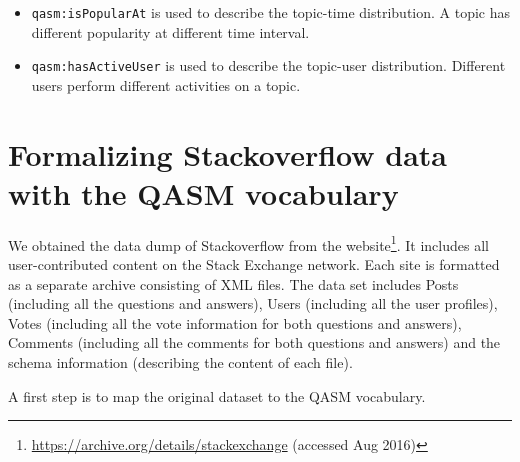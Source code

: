 \begin{itemize}
\item \texttt{qasm:isPopularAt} is used to describe the topic-time distribution. A topic has different popularity at different time interval.

\item \texttt{qasm:hasActiveUser} is used to describe the topic-user distribution. Different users perform different activities on a topic.
\end{itemize}





\section{Formalizing Stackoverflow data with the QASM vocabulary}

We obtained the data dump of Stackoverflow from the website\footnote{\url{https://archive.org/details/stackexchange} (accessed Aug 2016)}. It includes all user-contributed content on the Stack Exchange network. Each site is formatted as a separate archive consisting of XML files. The data set includes Posts (including all the questions and answers), Users (including all the user profiles), Votes (including all the vote information for both questions and answers), Comments (including all the comments for both questions and answers) and the schema information (describing the content of each file).

A first step is to map the original dataset to the QASM vocabulary. 

